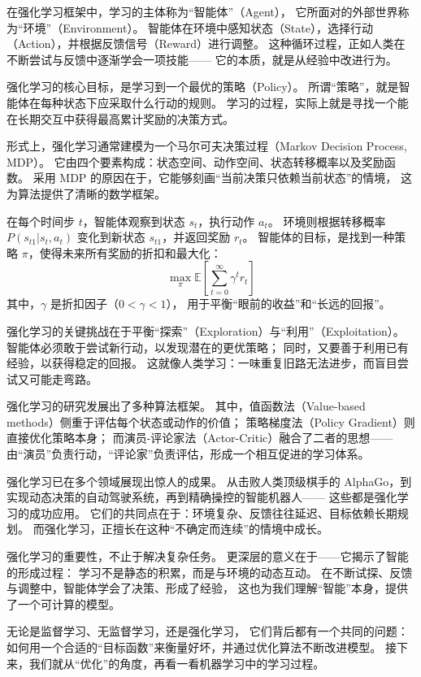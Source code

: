 在强化学习框架中，学习的主体称为“智能体”（Agent），  
它所面对的外部世界称为“环境”（Environment）。  
智能体在环境中感知状态（State），选择行动（Action），并根据反馈信号（Reward）进行调整。  
这种循环过程，正如人类在不断尝试与反馈中逐渐学会一项技能——  
它的本质，就是从经验中改进行为。

强化学习的核心目标，是学习到一个最优的策略（Policy）。  
所谓“策略”，就是智能体在每种状态下应采取什么行动的规则。  
学习的过程，实际上就是寻找一个能在长期交互中获得最高累计奖励的决策方式。

形式上，强化学习通常建模为一个马尔可夫决策过程（Markov Decision Process, MDP）。  
它由四个要素构成：状态空间、动作空间、状态转移概率以及奖励函数。  
采用 MDP 的原因在于，它能够刻画“当前决策只依赖当前状态”的情境，  
这为算法提供了清晰的数学框架。

在每个时间步 $t$，智能体观察到状态 $s_t$，执行动作 $a_t$。  
环境则根据转移概率 $P(s_{t1}|s_t, a_t)$ 变化到新状态 $s_{t1}$，并返回奖励 $r_t$。  
智能体的目标，是找到一种策略 $\pi$，使得未来所有奖励的折扣和最大化：
$$
\max_\pi \mathbb{E}\left[\sum_{t=0}^\infty \gamma^t r_t\right]
$$  
其中，$\gamma$ 是折扣因子（$0 < \gamma < 1$），  
用于平衡“眼前的收益”和“长远的回报”。

强化学习的关键挑战在于平衡“探索”（Exploration）与“利用”（Exploitation）。  
智能体必须敢于尝试新行动，以发现潜在的更优策略；  
同时，又要善于利用已有经验，以获得稳定的回报。  
这就像人类学习：一味重复旧路无法进步，而盲目尝试又可能走弯路。

强化学习的研究发展出了多种算法框架。  
其中，值函数法（Value-based methods）侧重于评估每个状态或动作的价值；  
策略梯度法（Policy Gradient）则直接优化策略本身；  
而演员-评论家法（Actor-Critic）融合了二者的思想——  
由“演员”负责行动，“评论家”负责评估，形成一个相互促进的学习体系。

强化学习已在多个领域展现出惊人的成果。  
从击败人类顶级棋手的 AlphaGo，到实现动态决策的自动驾驶系统，再到精确操控的智能机器人——  
这些都是强化学习的成功应用。  
它们的共同点在于：环境复杂、反馈往往延迟、目标依赖长期规划。  
而强化学习，正擅长在这种“不确定而连续”的情境中成长。

强化学习的重要性，不止于解决复杂任务。  
更深层的意义在于——它揭示了智能的形成过程：  
学习不是静态的积累，而是与环境的动态互动。  
在不断试探、反馈与调整中，智能体学会了决策、形成了经验，  
这也为我们理解“智能”本身，提供了一个可计算的模型。

无论是监督学习、无监督学习，还是强化学习，  
它们背后都有一个共同的问题：  
如何用一个合适的“目标函数”来衡量好坏，并通过优化算法不断改进模型。  
接下来，我们就从“优化”的角度，再看一看机器学习中的学习过程。

